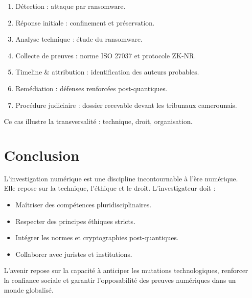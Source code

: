 \documentclass[12pt,a4paper]{article}
\begin{document}
\begin{enumerate}
    \item Détection : attaque par ransomware.
    \item Réponse initiale : confinement et préservation.
    \item Analyse technique : étude du ransomware.
    \item Collecte de preuves : norme ISO 27037 et protocole ZK-NR.
    \item Timeline \& attribution : identification des auteurs probables.
    \item Remédiation : défenses renforcées post-quantiques.
    \item Procédure judiciaire : dossier recevable devant les tribunaux camerounais.
\end{enumerate}

Ce cas illustre la transversalité : technique, droit, organisation.

\section*{Conclusion}

L’investigation numérique est une discipline incontournable à l’ère numérique. 
Elle repose sur la technique, l’éthique et le droit. 
L’investigateur doit :

\begin{itemize}
    \item Maîtriser des compétences pluridisciplinaires.
    \item Respecter des principes éthiques stricts.
    \item Intégrer les normes et cryptographies post-quantiques.
    \item Collaborer avec juristes et institutions.
\end{itemize}

L’avenir repose sur la capacité à anticiper les mutations technologiques, renforcer la confiance sociale et garantir l’opposabilité des preuves numériques dans un monde globalisé.
\end{document}
